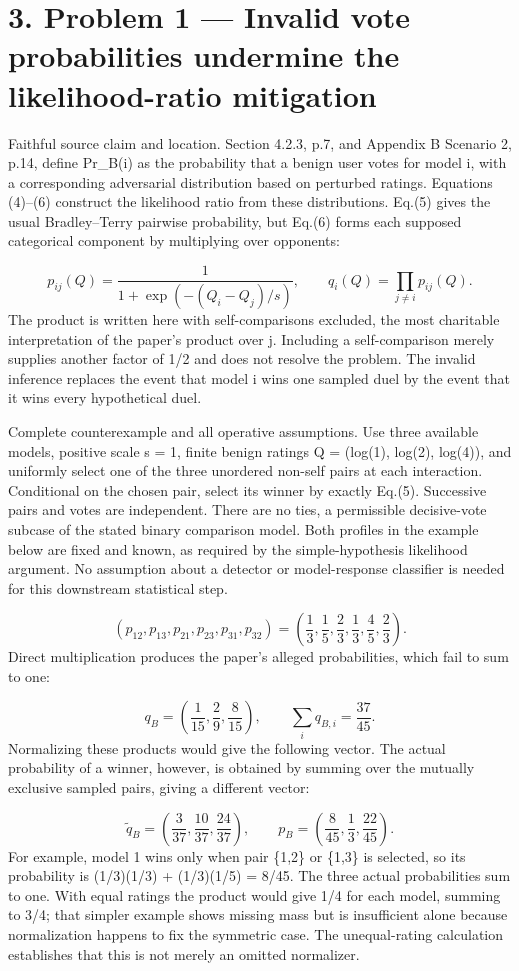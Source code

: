 \documentclass[10pt]{article}
\begin{document}
\section*{3. Problem 1 — Invalid vote probabilities undermine the likelihood-ratio mitigation}
Faithful source claim and location. Section 4.2.3, p.7, and Appendix B Scenario 2, p.14, define Pr\_B(i) as the probability that a benign user votes for model i, with a corresponding adversarial distribution based on perturbed ratings. Equations (4)–(6) construct the likelihood ratio from these distributions. Eq.(5) gives the usual Bradley–Terry pairwise probability, but Eq.(6) forms each supposed categorical component by multiplying over opponents:\par
\[p_{ij}(Q)=\frac1{1+\exp(-(Q_i-Q_j)/s)},\qquad
q_i(Q)=\prod_{j\ne i}p_{ij}(Q).\] The product is written here with self-comparisons excluded, the most charitable interpretation of the paper’s product over j. Including a self-comparison merely supplies another factor of 1/2 and does not resolve the problem. The invalid inference replaces the event that model i wins one sampled duel by the event that it wins every hypothetical duel.\par
Complete counterexample and all operative assumptions. Use three available models, positive scale s = 1, finite benign ratings Q = (log(1), log(2), log(4)), and uniformly select one of the three unordered non-self pairs at each interaction. Conditional on the chosen pair, select its winner by exactly Eq.(5). Successive pairs and votes are independent. There are no ties, a permissible decisive-vote subcase of the stated binary comparison model. Both profiles in the example below are fixed and known, as required by the simple-hypothesis likelihood argument. No assumption about a detector or model-response classifier is needed for this downstream statistical step.\par
\[(p_{12},p_{13},p_{21},p_{23},p_{31},p_{32})
=\left(\frac13,\frac15,\frac23,\frac13,\frac45,\frac23\right).\] Direct multiplication produces the paper’s alleged probabilities, which fail to sum to one:\par
\[q_B=\left(\frac1{15},\frac29,\frac8{15}\right),\qquad
\sum_i q_{B,i}=\frac{37}{45}.\] Normalizing these products would give the following vector. The actual probability of a winner, however, is obtained by summing over the mutually exclusive sampled pairs, giving a different vector:\par
\[\widetilde q_B=\left(\frac3{37},\frac{10}{37},\frac{24}{37}\right),\qquad
p_B=\left(\frac8{45},\frac13,\frac{22}{45}\right).\] For example, model 1 wins only when pair \{1,2\} or \{1,3\} is selected, so its probability is (1/3)(1/3) + (1/3)(1/5) = 8/45. The three actual probabilities sum to one. With equal ratings the product would give 1/4 for each model, summing to 3/4; that simpler example shows missing mass but is insufficient alone because normalization happens to fix the symmetric case. The unequal-rating calculation establishes that this is not merely an omitted normalizer.\par
\end{document}
